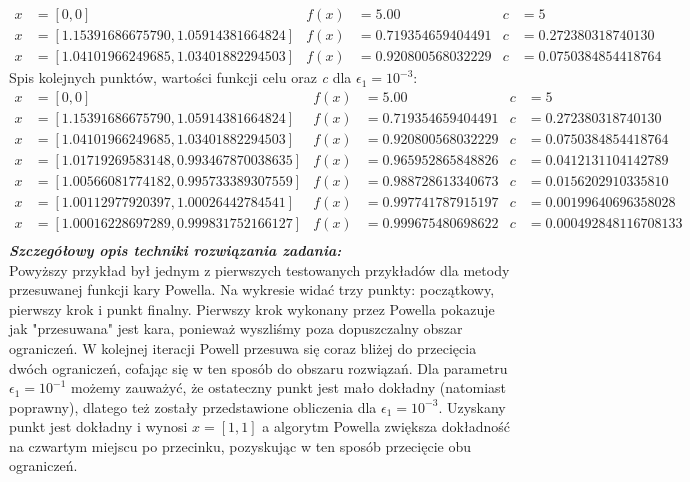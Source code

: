 \documentclass[a4paper,12pt]{article}
\begin{document}
\begin{align*}
x &= [0, 0] & f(x) &= 5.00 & c &= 5 \\
x &= [1.15391686675790, 1.05914381664824] & 
f(x) &= 0.719354659404491 & 
c &= 0.272380318740130 \\
x &= [1.04101966249685, 1.03401882294503] & 
f(x) &= 0.920800568032229 & 
c &= 0.0750384854418764 
\end{align*}
Spis kolejnych punktów, wartości funkcji celu oraz \textit{c}  dla $\epsilon_{1} = 10^{-3}$:
\begin{align*}
x &= [0, 0] & f(x) &= 5.00 & c &= 5 \\
x &= [1.15391686675790, 1.05914381664824] & 
f(x) &= 0.719354659404491 & 
c &= 0.272380318740130 \\
x &= [1.04101966249685,1.03401882294503] & 
f(x) &= 0.920800568032229 & 
c &= 0.0750384854418764 \\
x &= [1.01719269583148, 0.993467870038635] & 
f(x) &= 0.965952865848826 & 
c &= 0.0412131104142789 \\
x &= [1.00566081774182, 0.995733389307559] & 
f(x) &= 0.988728613340673 & 
c &= 0.0156202910335810 \\
x &= [1.00112977920397, 1.00026442784541] & 
f(x) &= 0.997741787915197 & 
c &= 0.00199640696358028 \\
x &= [1.00016228697289, 0.999831752166127] & 
f(x) &= 0.999675480698622 & 
c &= 0.000492848116708133 \\
\end{align*}
\newline
\textbf{\textit{Szczegółowy opis techniki rozwiązania zadania:}} \\
Powyższy przykład był jednym z pierwszych testowanych przykładów dla metody przesuwanej funkcji kary Powella. Na wykresie widać trzy punkty: początkowy, pierwszy krok i punkt finalny. Pierwszy krok wykonany przez Powella pokazuje jak "przesuwana" jest kara, ponieważ wyszliśmy poza dopuszczalny obszar ograniczeń. W kolejnej iteracji Powell przesuwa się coraz bliżej do przecięcia dwóch ograniczeń, cofając się w ten sposób do obszaru rozwiązań. Dla parametru $\epsilon_{1} = 10^{-1}$ możemy zauważyć, że ostateczny punkt jest mało dokładny (natomiast poprawny), dlatego też zostały przedstawione obliczenia dla $\epsilon_{1} = 10^{-3}$. Uzyskany punkt jest dokładny i wynosi $x = [1, 1]$ a algorytm Powella zwiększa dokładność na czwartym miejscu po przecinku, pozyskując w ten sposób przecięcie obu ograniczeń.
\end{document}
